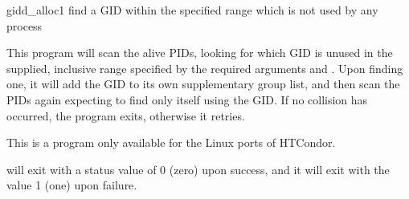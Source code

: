 \begin{ManPage}{\label{man-gidd-alloc}gidd\_alloc}{1}
{find a GID within the specified range which is not used by any process}
\Synopsis {}


\Description 

This program will scan the alive PIDs, looking for which GID is unused in
the supplied, inclusive range specified by the required arguments
 and . 
Upon finding one,
it will add the GID to its own supplementary group list,
and then scan the PIDs again expecting to find only itself using the GID. 
If no collision has occurred, the program exits, otherwise it retries.

	
\GenRem

This is a program only available for the Linux ports of HTCondor.

\ExitStatus

 will exit with a status value of 0 (zero) upon success,
and it will exit with the value 1 (one) upon failure.

\end{ManPage}
